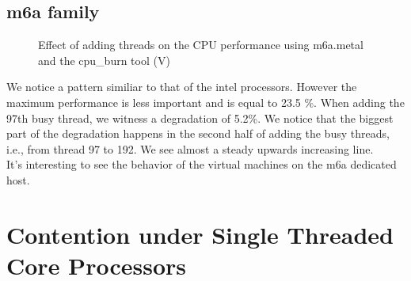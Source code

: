 \subsection{m6a family}
\begin{figure}[H]
\centering
{}
\caption{Effect of adding threads on the CPU performance using m6a.metal and the cpu\_burn tool (V)} 
\end{figure}
We notice a pattern similiar to that of the intel processors. However the maximum performance is 
less important and is equal to 23.5 \%. When adding the 97th busy thread, we witness a degradation 
of 5.2\%. We notice that the biggest part of the degradation happens in the second half of adding the 
busy threads, i.e., from thread 97 to 192. We see almost a steady upwards increasing line. \\
It's interesting to see the behavior of the virtual machines on the m6a dedicated host. 

\section{Contention under Single Threaded Core Processors}
